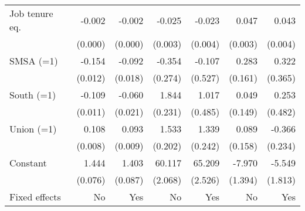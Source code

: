 {\begin{tabular}{l*{6}{D{.}{.}{-1}}}
\addlinespace
Job tenure eq.      &      -0.002\sym{***}&      -0.002\sym{***}&      -0.025\sym{***}&      -0.023\sym{***}&       0.047\sym{***}&       0.043\sym{***}\\
                    &     (0.000)         &     (0.000)         &     (0.003)         &     (0.004)         &     (0.003)         &     (0.004)         \\
\addlinespace
SMSA (=1)           &      -0.154\sym{***}&      -0.092\sym{***}&      -0.354         &      -0.107         &       0.283\sym{*}  &       0.322         \\
                    &     (0.012)         &     (0.018)         &     (0.274)         &     (0.527)         &     (0.161)         &     (0.365)         \\
\addlinespace
South (=1)          &      -0.109\sym{***}&      -0.060\sym{***}&       1.844\sym{***}&       1.017\sym{**} &       0.049         &       0.253         \\
                    &     (0.011)         &     (0.021)         &     (0.231)         &     (0.485)         &     (0.149)         &     (0.482)         \\
\addlinespace
Union (=1)          &       0.108\sym{***}&       0.093\sym{***}&       1.533\sym{***}&       1.339\sym{***}&       0.089         &      -0.366         \\
                    &     (0.008)         &     (0.009)         &     (0.202)         &     (0.242)         &     (0.158)         &     (0.234)         \\
\addlinespace
Constant            &       1.444\sym{***}&       1.403\sym{***}&      60.117\sym{***}&      65.209\sym{***}&      -7.970\sym{***}&      -5.549\sym{***}\\
                    &     (0.076)         &     (0.087)         &     (2.068)         &     (2.526)         &     (1.394)         &     (1.813)         \\
\midrule
Fixed effects       &          No         &         Yes         &          No         &         Yes         &          No         &         Yes         \\
\bottomrule
\end{tabular}
}
